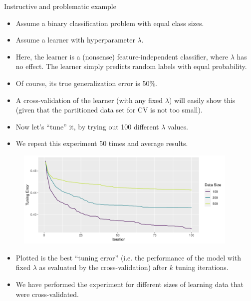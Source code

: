 \begin{vbframe}{Instructive and problematic example}
\begin{itemize}
    \item Assume a binary classification problem with equal class sizes.
    \item Assume a learner with hyperparameter $\lambda$.
    \item Here, the learner is a (nonsense) feature-independent classifier,
          where $\lambda$ has no effect. The learner simply
          predicts random labels with equal probability.
    \item Of course, its true generalization error is 50\%.
    \item A cross-validation of the learner (with any fixed $\lambda$) will easily show this
      (given that the partitioned data set for CV is not too small).
    \item Now let's \enquote{tune} it, by trying out 100 different $\lambda$ values.
    \item We repeat this experiment 50 times and average results.
\end{itemize}

\framebreak

\begin{figure}
\centering 
\includegraphics[width=0.95\textwidth]{figure/cart_tuning_nestintro_1} 
\end{figure}



\begin{itemize}
\item Plotted is the best \enquote{tuning error} (i.e. the performance of the model with fixed $\lambda$ as evaluated by the cross-validation) after $k$ tuning iterations.
\item We have performed the experiment for different sizes of learning data
      that were cross-validated.
\end{itemize}


\end{vbframe}
